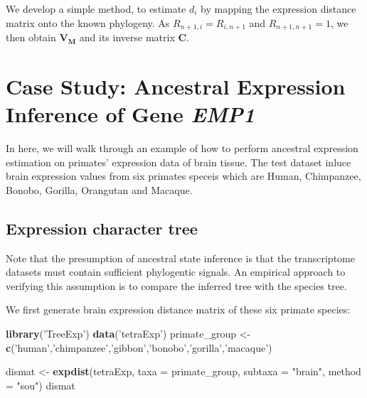 \documentclass[]{book}
\newenvironment{Shaded}{\begin{snugshade}}{\end{snugshade}}
\newcommand{\DataTypeTok}[1]{\textcolor[rgb]{0.13,0.29,0.53}{#1}}
\newcommand{\KeywordTok}[1]{\textcolor[rgb]{0.13,0.29,0.53}{\textbf{#1}}}
\newcommand{\NormalTok}[1]{#1}
\newcommand{\StringTok}[1]{\textcolor[rgb]{0.31,0.60,0.02}{#1}}
\begin{document}
We develop a simple method, to estimate \(d_i\) by mapping the expression distance matrix onto the known phylogeny. As \(R_{n+1,i}= R_{i,n+1}\) and \(R_{n+1,n+1}=1\), we then obtain \(\boldsymbol{V_M}\) and its inverse matrix \(\boldsymbol{C}\).

\newpage

\hypertarget{case-study-ancestral-expression-inference-of-gene-emp1}{%
\section{\texorpdfstring{Case Study: Ancestral Expression Inference of Gene \emph{EMP1}}{Case Study: Ancestral Expression Inference of Gene EMP1}}\label{case-study-ancestral-expression-inference-of-gene-emp1}}

In here, we will walk through an example of how to perform ancestral expression estimation on primates' expression data of brain tissue. The test dataset inluce brain expression values from six primates speceis which are Human, Chimpanzee, Bonobo, Gorilla, Orangutan and Macaque.

\hypertarget{expression-character-tree-1}{%
\subsection{Expression character tree}\label{expression-character-tree-1}}

Note that the presumption of ancestral state inference is that the transcriptome datasets must contain sufficient phylogentic signals. An empirical approach to verifying this assumption is to compare the inferred tree with the species tree.

We first generate brain expression distance matrix of these six primate species:

\begin{Shaded}
\begin{Highlighting}[]
\KeywordTok{library}\NormalTok{(}\StringTok{'TreeExp'}\NormalTok{)}
\KeywordTok{data}\NormalTok{(}\StringTok{'tetraExp'}\NormalTok{)}
\NormalTok{primate_group <-}\KeywordTok{c}\NormalTok{(}\StringTok{'human'}\NormalTok{,}\StringTok{'chimpanzee'}\NormalTok{,}\StringTok{'gibbon'}\NormalTok{,}\StringTok{'bonobo'}\NormalTok{,}\StringTok{'gorilla'}\NormalTok{,}\StringTok{'macaque'}\NormalTok{)}

\NormalTok{dismat <-}\StringTok{ }\KeywordTok{expdist}\NormalTok{(tetraExp, }\DataTypeTok{taxa =}\NormalTok{ primate_group, }
                  \DataTypeTok{subtaxa =} \StringTok{"brain"}\NormalTok{, }\DataTypeTok{method =} \StringTok{"sou"}\NormalTok{)}
\NormalTok{dismat}
\end{Highlighting}
\end{Shaded}
\end{document}
